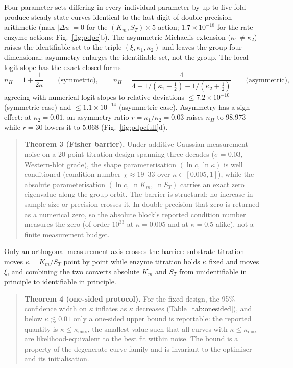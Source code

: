 \documentclass[11pt,a4paper]{article}
\begin{document}
Four parameter sets differing in every individual parameter by up to five-fold produce steady-state curves identical to the last digit of double-precision arithmetic (max $|\Delta u|=0$ for the $(K_m,S_T)\times5$ action; $1.7\times10^{-18}$ for the rate--enzyme actions; Fig.~\ref{fig:pdpc}b). The asymmetric-Michaelis extension ($\kappa_1\neq\kappa_2$) raises the identifiable set to the triple $(\xi,\kappa_1,\kappa_2)$ and leaves the group four-dimensional: asymmetry enlarges the identifiable set, not the group. The local logit slope has the exact closed forms
\begin{equation}
n_H=1+\frac{1}{2\kappa}\qquad\text{(symmetric)},\qquad
n_H=\frac{4}{4-1/(\kappa_1+\tfrac12)-1/(\kappa_2+\tfrac12)}\qquad\text{(asymmetric)},
\label{eq:hill}
\end{equation}
agreeing with numerical logit slopes to relative deviations $\le7.2\times10^{-10}$ (symmetric case) and $\le1.1\times10^{-14}$ (asymmetric case). Asymmetry has a sign effect: at $\kappa_2=0.01$, an asymmetry ratio $r=\kappa_1/\kappa_2=0.03$ raises $n_H$ to $98.973$ while $r=30$ lowers it to $5.068$ (Fig.~\ref{fig:pdpcfull}d).

\begin{quote}
\textbf{Theorem 3 (Fisher barrier).} Under additive Gaussian measurement noise on a 20-point titration design spanning three decades ($\sigma=0.03$, Western-blot grade), the shape parameterisation $(\ln c,\ln\kappa)$ is well conditioned (condition number $\chi\approx19$--$33$ over $\kappa\in[0.005,1]$), while the absolute parameterisation $(\ln c,\ln K_m,\ln S_T)$ carries an exact zero eigenvalue along the group orbit. The barrier is structural: no increase in sample size or precision crosses it. In double precision that zero is returned as a numerical zero, so the absolute block's reported condition number measures the zero (of order $10^{33}$ at $\kappa=0.005$ and at $\kappa=0.5$ alike), not a finite measurement budget.
\end{quote}

Only an orthogonal measurement axis crosses the barrier: substrate titration moves $\kappa=K_m/S_T$ point by point while enzyme titration holds $\kappa$ fixed and moves $\xi$, and combining the two converts absolute $K_m$ and $S_T$ from unidentifiable in principle to identifiable in principle.

\begin{quote}
\textbf{Theorem 4 (one-sided protocol).} For the fixed design, the 95\% confidence width on $\kappa$ inflates as $\kappa$ decreases (Table~\ref{tab:onesided}), and below $\kappa\lesssim0.01$ only a one-sided upper bound is reportable: the reported quantity is $\kappa\le\kappa_{\max}$, the smallest value such that all curves with $\kappa\le\kappa_{\max}$ are likelihood-equivalent to the best fit within noise. The bound is a property of the degenerate curve family and is invariant to the optimiser and its initialisation.
\end{quote}
\end{document}
